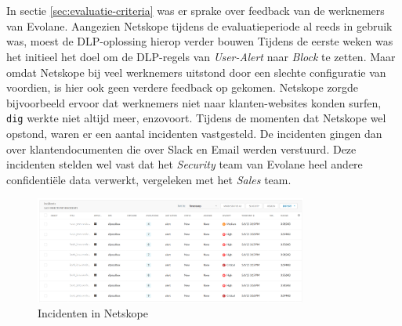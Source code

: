 
\chapter{}%
\label{ch:resultaten}


\section{}
\label{sec:incidenten-resultaten}

In sectie \ref{sec:evaluatie-criteria} was er sprake over feedback van de werknemers van Evolane.
Aangezien Netskope tijdens de evaluatieperiode al reeds in gebruik was, moest de DLP-oplossing hierop verder bouwen
Tijdens de eerste weken was het initieel het doel om de DLP-regels van \textit{User-Alert} naar \textit{Block} te zetten.
Maar omdat Netskope bij veel werknemers uitstond door een slechte configuratie van voordien, is hier ook geen verdere feedback op gekomen.
Netskope zorgde bijvoorbeeld ervoor dat werknemers niet naar klanten-websites konden surfen, \texttt{dig} werkte niet altijd meer, enzovoort.
Tijdens de momenten dat Netskope wel opstond, waren er een aantal incidenten vastgesteld.
De incidenten gingen dan over klantendocumenten die over Slack en Email werden verstuurd. 
Deze incidenten stelden wel vast dat het \textit{Security} team van Evolane heel andere confidentiële data verwerkt, vergeleken met het \textit{Sales} team.

\begin{figure}[h]
    \centering
    \includegraphics[width=0.8\textwidth]{img/netskope_incidents2.png}
    \caption{Incidenten in Netskope}
    \label{fig:netskope_incidenten}
\end{figure}

\section{}
\label{sec:res-vooraf-gedefinieerde-dlp-regels}



